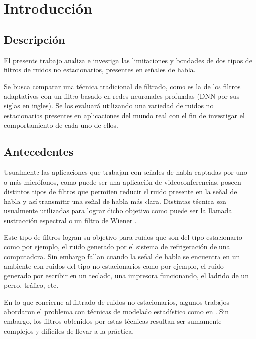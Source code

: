 \section{Introducción}

\subsection{Descripción}

El presente trabajo analiza e investiga las limitaciones y bondades de dos tipos de filtros de ruidos no estacionarios, presentes en señales de habla.

Se busca comparar una técnica tradicional de filtrado, como es la de los filtros adaptativos con un filtro basado en redes neuronales profundas (DNN por sus siglas en ingles). Se los evaluará utilizando una variedad de ruidos no estacionarios presentes en aplicaciones del mundo real con el fin de investigar el comportamiento de cada uno de ellos.

\subsection{Antecedentes}

Usualmente las aplicaciones que trabajan con señales de habla captadas por uno o más micrófonos, como puede ser una aplicación de videoconferencias, poseen distintos tipos de filtros que permiten reducir el ruido presente en la señal de habla y así transmitir una señal de habla más clara. Distintas técnica son usualmente utilizadas para lograr dicho objetivo como puede ser la llamada sustracción espectral \cite{espectral_subtraction} o un filtro de Wiener \cite{philipos_book_speech_enhancement}.

Este tipo de filtros logran su objetivo para ruidos que son del tipo estacionario como por ejemplo, el ruido generado por el sistema de refrigeración de una computadora. Sin embargo fallan cuando la señal de habla se encuentra en un ambiente con ruidos del tipo no-estacionarios como por ejemplo, el ruido generado por escribir en un teclado, una impresora funcionando, el ladrido de un perro, tráfico, etc.  

En lo que concierne al filtrado de ruidos no-estacionarios, algunos trabajos abordaron el problema con técnicas de modelado estadístico como en \cite{speech_enhancement_for_non_stationary_noise_environments_using_statistical_estimators}. Sin embargo, los filtros obtenidos por estas técnicas resultan ser sumamente complejos y difíciles de llevar a la práctica.

